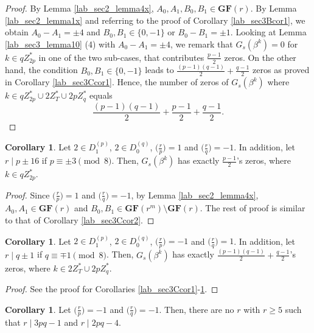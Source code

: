 \documentclass{mcom-l}
\theoremstyle{definition}
\newtheorem{sec3Ccor3}[sec3Bcor1]{Corollary}
\newtheorem{sec3Ccor4}[sec3Bcor1]{Corollary}
\newtheorem{sec3Ccor5}[sec3Bcor1]{Corollary}
\numberwithin{equation}{section}
\begin{document}
    \begin{proof}
    By Lemma \ref{lab_sec2_lemma4x}, $ A_{0},A_{1},B_{0},B_{1}\in \mathbf{GF}(r) $. By Lemma \ref{lab_sec2_lemma1x} and referring to the proof of Corollary \ref{lab_sec3Bcor1}, we obtain $ A_{0}-A_{1}=\pm 4 $ and $ B_{0},B_{1}\in \lbrace 0,-1\rbrace $ or $B_{0}-B_{1}=\pm 1  $. Looking at Lemma \ref{lab_sec3_lemma10} (4) with $ A_{0}-A_{1}=\pm 4 $, we remark that $ G_{s}(\beta^{k})=0 $ for $ k\in qZ_{2p}^{*} $ in one of the two sub-cases, that contributes $ \tfrac{p-1}{2} $ zeros. On the other hand, the condition $ B_{0},B_{1}\in \lbrace 0,-1\rbrace $ leads to $ \tfrac{(p-1)(q-1)}{2} +\tfrac{q-1}{2}$ zeros as proved in Corollary \ref{lab_sec3Ccor1}. Hence, the number of zeros of $ G_{s}(\beta^{k}) $ where $ k\in qZ_{2p}^{*}\cup 2Z_{T}^{*}\cup 2pZ_{q}^{*} $ equals 
         \begin{equation*}     
         \frac{(p-1)(q-1)}{2}+\frac{p-1}{2}+\frac{q-1}{2}.
         \end{equation*} 
    \end{proof} 
    \begin{sec3Ccor3}\label{lab_sec3Ccor3}
    Let $ 2\in D_{1}^{(p)} $, $ 2\in D_{0}^{(q)} $, $ \bigl(\tfrac{r}{p}\bigr) =1$ and $ \bigl(\tfrac{r}{q}\bigr) =-1$. In addition, let  $ r\mid p\pm 16 $ if $ p\equiv\pm 3\pmod 8 $. Then, $ G_{s}(\beta^{k}) $ has exactly $ \tfrac{p-1}{2} $'s zeros, where $ k\in qZ_{2p}^{*} $.
    \end{sec3Ccor3}
    \begin{proof}
    Since $ \bigl(\tfrac{r}{p}\bigr) =1$ and $ \bigl(\tfrac{r}{q}\bigr) =-1$, by Lemma \ref{lab_sec2_lemma4x}, $ A_{0},A_{1}\in \mathbf{GF}(r) $ and $B_{0},B_{1}\in \mathbf{GF}(r^{m})\setminus \mathbf{GF}(r) $. The rest of proof is similar to that of Corollary \ref{lab_sec3Ccor2}.
    \end{proof} 
    \begin{sec3Ccor4}\label{lab_sec3Ccor4}
       Let $ 2\in D_{1}^{(p)} $, $ 2\in D_{0}^{(q)} $, $ \bigl(\tfrac{r}{p}\bigr) =-1$ and $ \bigl(\tfrac{r}{q}\bigr) =1$. In addition, let  $ r\mid q\pm 1 $ if $ q\equiv\mp 1\pmod 8 $. Then, $ G_{s}(\beta^{k}) $ has exactly $ \tfrac{(p-1)(q-1)}{2}+\tfrac{q-1}{2} $'s zeros, where $ k\in  2Z_{T}^{*}\cup 2pZ_{q}^{*} $.
       \end{sec3Ccor4}
     \begin{proof}
     See the proof for Corollaries \ref{lab_sec3Ccor1}-\ref{lab_sec3Ccor3}.
     \end{proof} 
     \begin{sec3Ccor5}\label{lab_sec3Ccor5}
     Let $ \bigl(\tfrac{r}{p}\bigr) =-1$ and $ \bigl(\tfrac{r}{q}\bigr) =-1$. Then, there are no $ r $ with $ r\geq 5 $ such that $ r\mid 3pq-1 $ and $ r\mid 2pq-4 $.
     \end{sec3Ccor5}
\end{document}

